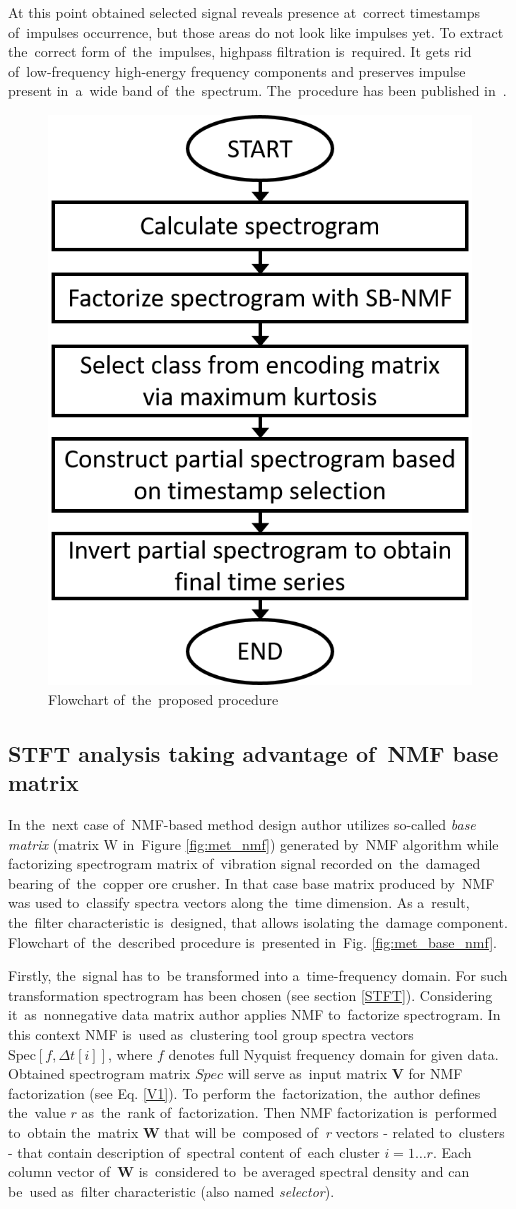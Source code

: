 At this point obtained selected signal reveals presence at~correct timestamps of~impulses occurrence, but those areas do not look like impulses yet. To extract the~correct form of~the~impulses, highpass filtration is~required. It gets rid of~low-frequency high-energy frequency components and preserves impulse present in~a~wide band of~the~spectrum. The~procedure has been published in~\cite{wodecki2017local}.


\begin{figure}[ht!]
\centering
\includegraphics[width=.4\textwidth]{wykresy/met_enc_nmf.png}
\caption{Flowchart of~the~proposed procedure}
\label{fig:met_enc_nmf}
\end{figure}

\subsection{STFT analysis taking advantage of~NMF base matrix}\label{met_nmf_base}

In the~next case of~NMF-based method design author utilizes so-called \emph{base matrix} (matrix W in~Figure \ref{fig:met_nmf}) generated by~NMF algorithm while factorizing spectrogram matrix of~vibration signal recorded on~the~damaged bearing of~the~copper ore crusher. In that case base matrix produced by~NMF was used to~classify spectra vectors along the~time dimension. As a~result, the~filter characteristic is~designed, that allows isolating the~damage component. Flowchart of~the~described procedure is~presented in~Fig. \ref{fig:met_base_nmf}.

Firstly, the~signal has to~be transformed into a~time-frequency domain. For such transformation spectrogram has been chosen (see section \ref{STFT}). Considering it~as~nonnegative data matrix author applies NMF to~factorize spectrogram. In this context NMF is~used as~clustering tool group spectra vectors $\textrm{Spec}[f,\Delta t[i]]$, where $f$ denotes full Nyquist frequency domain for given data. Obtained spectrogram matrix $Spec$ will serve as~input matrix $\mathbf{V}$ for NMF factorization (see Eq. \ref{V1}). To perform the~factorization, the~author defines the~value $r$ as~the~rank of~factorization. Then NMF factorization is~performed to~obtain the~matrix \textbf{W} that will be~composed of~\textit{r} vectors - related to~clusters - that contain description of~spectral content of~each cluster $i=1 \dots r$. Each column vector of~\textbf{W} is~considered to~be averaged spectral density and can be~used as~filter characteristic (also named \emph{selector}).

